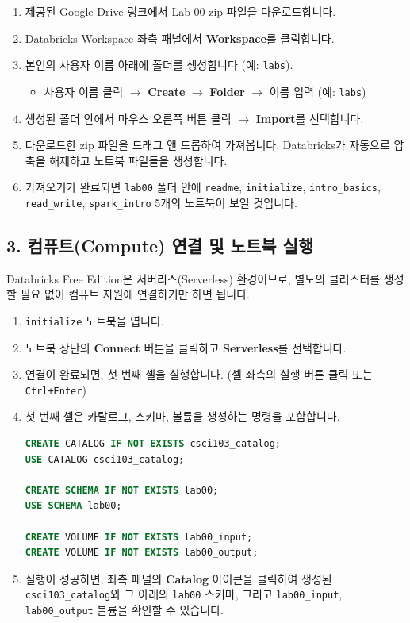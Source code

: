 \documentclass[11pt,a4paper]{article}
\begin{document}
\begin{enumerate}
    \item 제공된 Google Drive 링크에서 Lab 00 zip 파일을 다운로드합니다.
    \item Databricks Workspace 좌측 패널에서 \textbf{Workspace}를 클릭합니다.
    \item 본인의 사용자 이름 아래에 폴더를 생성합니다 (예: \texttt{labs}).
        \begin{itemize}
            \item 사용자 이름 클릭 $\rightarrow$ \textbf{Create} $\rightarrow$ \textbf{Folder} $\rightarrow$ 이름 입력 (예: \texttt{labs})
        \end{itemize}
    \item 생성된 폴더 안에서 마우스 오른쪽 버튼 클릭 $\rightarrow$ \textbf{Import}를 선택합니다.
    \item 다운로드한 zip 파일을 드래그 앤 드롭하여 가져옵니다. Databricks가 자동으로 압축을 해제하고 노트북 파일들을 생성합니다.
    \item 가져오기가 완료되면 \texttt{lab00} 폴더 안에 \texttt{readme}, \texttt{initialize}, \texttt{intro\_basics}, \texttt{read\_write}, \texttt{spark\_intro} 5개의 노트북이 보일 것입니다.
\end{enumerate}

\subsection*{3. 컴퓨트(Compute) 연결 및 노트북 실행}

Databricks Free Edition은 서버리스(Serverless) 환경이므로, 별도의 클러스터를 생성할 필요 없이 컴퓨트 자원에 연결하기만 하면 됩니다.

\begin{enumerate}
    \item \texttt{initialize} 노트북을 엽니다.
    \item 노트북 상단의 \textbf{Connect} 버튼을 클릭하고 \textbf{Serverless}를 선택합니다.
    \item 연결이 완료되면, 첫 번째 셀을 실행합니다. (셀 좌측의 실행 버튼 클릭 또는 \texttt{Ctrl+Enter})
    \item 첫 번째 셀은 카탈로그, 스키마, 볼륨을 생성하는 명령을 포함합니다.
        \begin{lstlisting}[language=sql, caption={initialize 노트북의 첫 번째 셀 예시}, label={lst:initialize_cell1}]
CREATE CATALOG IF NOT EXISTS csci103_catalog;
USE CATALOG csci103_catalog;

CREATE SCHEMA IF NOT EXISTS lab00;
USE SCHEMA lab00;

CREATE VOLUME IF NOT EXISTS lab00_input;
CREATE VOLUME IF NOT EXISTS lab00_output;
        \end{lstlisting}
    \item 실행이 성공하면, 좌측 패널의 \textbf{Catalog} 아이콘을 클릭하여 생성된 \texttt{csci103\_catalog}와 그 아래의 \texttt{lab00} 스키마, 그리고 \texttt{lab00\_input}, \texttt{lab00\_output} 볼륨을 확인할 수 있습니다.
\end{enumerate}
\end{document}
